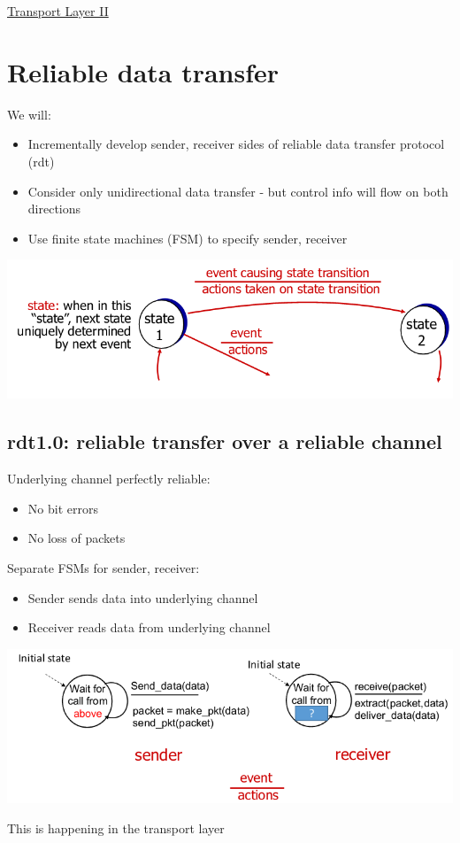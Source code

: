 \documentclass{article}[18pt]
\begin{document}
\begin{center}
\underline{\huge Transport Layer II}
\end{center}
\section{Reliable data transfer}
We will:
\begin{itemize}
	\item Incrementally develop sender, receiver sides of reliable data transfer protocol (rdt)
	\item Consider only unidirectional data transfer - but control info will flow on both directions
	\item Use finite state machines (FSM) to specify sender, receiver
\end{itemize}
\begin{center}
	\includegraphics[scale=0.7]{rdt}
\end{center}
\subsection{rdt1.0: reliable transfer over a reliable channel}
Underlying channel perfectly reliable:
\begin{itemize}
	\item No bit errors
	\item No loss of packets
\end{itemize}
Separate FSMs for sender, receiver:
\begin{itemize}
	\item Sender sends data into underlying channel
	\item Receiver reads data from underlying channel
\end{itemize}
\begin{center}
	\includegraphics[scale=0.7]{rdt1}
\end{center}
\begin{important}
This is happening in the transport layer
\end{important}
\end{document}
